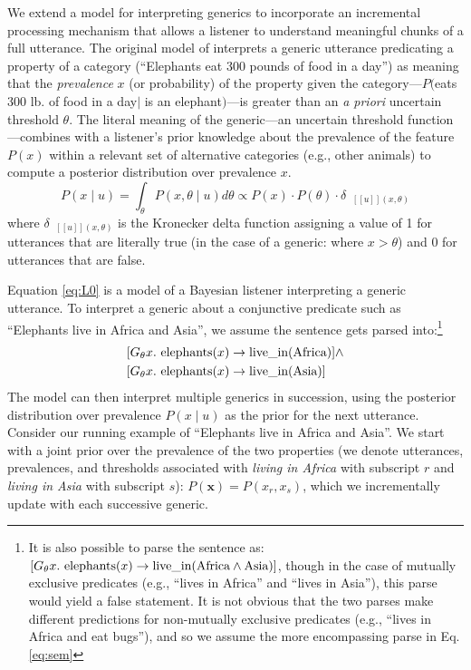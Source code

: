 \documentclass[10pt,letterpaper]{article}
\newcommand{\denote}[1]{\mbox{ $[\![ #1 ]\!]$}}
\begin{document}
We extend a model for interpreting generics to incorporate an incremental processing mechanism that allows a listener to understand meaningful chunks of a full utterance.
The original model of  interprets a generic utterance predicating a property of a category (``Elephants eat 300 pounds of food in a day'') as meaning that the \emph{prevalence} $x$ (or probability) of the property given the category---$P($eats 300 lb. of food in a day$\mid$ is an elephant$)$---is greater than an \emph{a priori} uncertain threshold $\theta$.
The literal meaning of the generic---an uncertain threshold function---combines with a listener's prior knowledge about the prevalence of the feature $P(x)$ within a relevant set of alternative categories (e.g., other animals) to compute a posterior distribution over prevalence $x$. 
\begin{equation}
P(x \mid u) = \int_{\theta} P(x, \theta \mid u)  d\theta \propto P(x) \cdot P(\theta) \cdot \delta_{\denote{u}(x, \theta)} 
\label{eq:L0}
\end{equation}
\noindent where $\delta_{\denote{u}(x, \theta)}$ is the Kronecker delta function assigning a value of 1 for utterances that are literally true (in the case of a generic: where $x > \theta$) and 0 for utterances that are false.



Equation \ref{eq:L0} is a model of a Bayesian listener interpreting a generic utterance.
To interpret a generic about a conjunctive predicate such as ``Elephants live in Africa and Asia'', we assume the sentence gets parsed into:\footnote{
It is also possible to parse the sentence as:
 $[G_\theta x. \textnormal{ elephants}(x) \to \textnormal{live\_in}(\textnormal{Africa} \land \textnormal{Asia})]$, though in the case of mutually exclusive predicates (e.g., ``lives in Africa'' and ``lives in Asia''), this parse would yield a false statement. It is not obvious that the two parses make different predictions for non-mutually exclusive predicates (e.g., ``lives in Africa and eat bugs''), and so we assume the more encompassing parse in Eq. \ref{eq:sem}
}
\begin{equation}
\begin{split}
[G_\theta x. \textnormal{ elephants}(x)& \to \textnormal{live\_in}(\textnormal{Africa})] \land \\
[G_\theta x. \textnormal{ elephants}(x)& \to \textnormal{live\_in}(\textnormal{Asia})] 
\end{split}
\label{eq:sem}
\end{equation}
The model can then interpret multiple generics in succession, using the posterior distribution over prevalence $P(x \mid u)$ as the prior for the next utterance. 
Consider our running example of ``Elephants live in Africa and Asia''.
We start with a joint prior over the prevalence of the two properties (we denote utterances, prevalences, and thresholds associated with \emph{living in Africa} with subscript $r$ and \emph{living in Asia} with subscript $s$): $P(\textbf{x}) = P(x_{r}, x_{s})$, which we incrementally update with each successive generic. 
\end{document}
